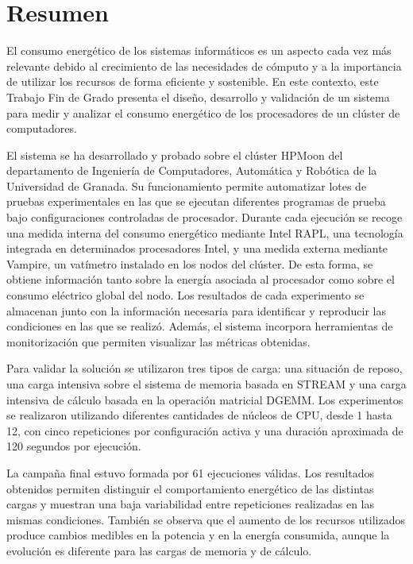\chapter*{Resumen}

El consumo energético de los sistemas informáticos es un aspecto cada vez más relevante debido al crecimiento de las necesidades de cómputo y a la importancia de utilizar los recursos de forma eficiente y sostenible. En este contexto, este Trabajo Fin de Grado presenta el diseño, desarrollo y validación de un sistema para medir y analizar el consumo energético de los procesadores de un clúster de computadores.

El sistema se ha desarrollado y probado sobre el clúster HPMoon del departamento de Ingeniería de Computadores, Automática y Robótica de la Universidad de Granada. Su funcionamiento permite automatizar lotes de pruebas experimentales en las que se ejecutan diferentes programas de prueba bajo configuraciones controladas de procesador. Durante cada ejecución se recoge una medida interna del consumo energético mediante Intel RAPL, una tecnología integrada en determinados procesadores Intel, y una medida externa mediante Vampire, un vatímetro instalado en los nodos del clúster. De esta forma, se obtiene información tanto sobre la energía asociada al procesador como sobre el consumo eléctrico global del nodo. Los resultados de cada experimento se almacenan junto con la información necesaria para identificar y reproducir las condiciones en las que se realizó. Además, el sistema incorpora herramientas de monitorización que permiten visualizar las métricas obtenidas.

Para validar la solución se utilizaron tres tipos de carga: una situación de reposo, una carga intensiva sobre el sistema de memoria basada en STREAM y una carga intensiva de cálculo basada en la operación matricial DGEMM. Los experimentos se realizaron utilizando diferentes cantidades de núcleos de CPU, desde 1 hasta 12, con cinco repeticiones por configuración activa y una duración aproximada de 120 segundos por ejecución.

La campaña final estuvo formada por 61 ejecuciones válidas. Los resultados obtenidos permiten distinguir el comportamiento energético de las distintas cargas y muestran una baja variabilidad entre repeticiones realizadas en las mismas condiciones. También se observa que el aumento de los recursos utilizados produce cambios medibles en la potencia y en la energía consumida, aunque la evolución es diferente para las cargas de memoria y de cálculo.

